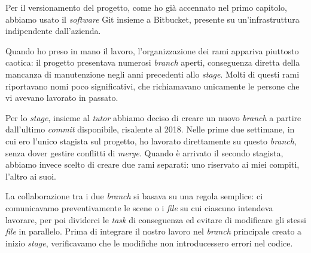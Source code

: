 Per il versionamento del progetto, come ho già accennato nel primo capitolo, abbiamo usato il \textit{software} Git insieme a Bitbucket, presente su un'infrastruttura indipendente dall'azienda.


 
Quando ho preso in mano il lavoro, l'organizzazione dei rami appariva piuttosto caotica: il progetto presentava numerosi \textit{branch} aperti, conseguenza diretta della mancanza di manutenzione negli anni precedenti allo \textit{stage}. Molti di questi rami riportavano nomi poco significativi, che richiamavano unicamente le persone che vi avevano lavorato in passato.
 
Per lo \textit{stage}, insieme al \textit{tutor} abbiamo deciso di creare un nuovo \textit{branch} a partire dall'ultimo \textit{commit} disponibile, risalente al 2018. Nelle prime due settimane, in cui ero l'unico stagista sul progetto, ho lavorato direttamente su questo \textit{branch}, senza dover gestire conflitti di \textit{merge}. Quando è arrivato il secondo stagista, abbiamo invece scelto di creare due rami separati: uno riservato ai miei compiti, l'altro ai suoi.
 
 
La collaborazione tra i due \textit{branch} si basava su una regola semplice: ci comunicavamo preventivamente le scene o i \textit{file} su cui ciascuno intendeva lavorare, per poi dividerci le \textit{task} di conseguenza ed evitare di modificare gli stessi \textit{file} in parallelo. Prima di integrare il nostro lavoro nel \textit{branch} principale creato a inizio \textit{stage}, verificavamo che le modifiche non introducessero errori nel codice.
 
